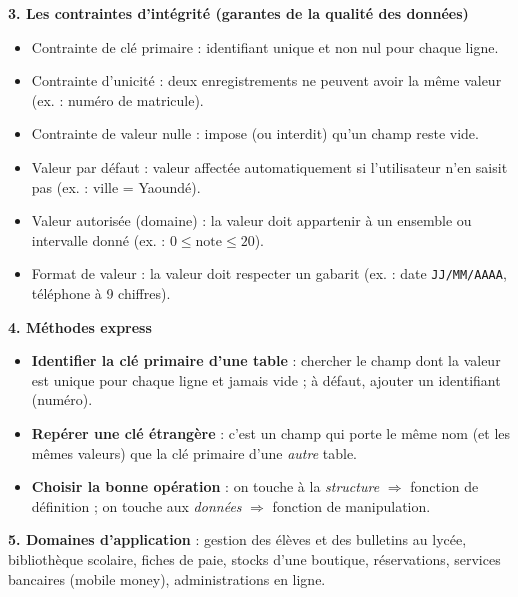 \documentclass[11pt]{article}
\newcommand{\cle}[1]{{\popxbold\color{popdark}#1}}
\begin{document}
\begin{bilan}
\textbf{3. Les contraintes d'intégrité (garantes de la qualité des données)}
\begin{itemize}
  \item \cle{Contrainte de clé primaire} : identifiant unique et non nul pour chaque ligne.
  \item \cle{Contrainte d'unicité} : deux enregistrements ne peuvent avoir la même valeur (ex. : numéro de matricule).
  \item \cle{Contrainte de valeur nulle} : impose (ou interdit) qu'un champ reste vide.
  \item \cle{Valeur par défaut} : valeur affectée automatiquement si l'utilisateur n'en saisit pas (ex. : ville = \og{}Yaoundé\fg{}).
  \item \cle{Valeur autorisée} (domaine) : la valeur doit appartenir à un ensemble ou intervalle donné (ex. : $0 \leq \text{note} \leq 20$).
  \item \cle{Format de valeur} : la valeur doit respecter un gabarit (ex. : date \texttt{JJ/MM/AAAA}, téléphone à 9 chiffres).
\end{itemize}

\textbf{4. Méthodes express}
\begin{itemize}
  \item \textbf{Identifier la clé primaire d'une table} : chercher le champ dont la valeur est unique pour chaque ligne et jamais vide ; à défaut, ajouter un identifiant (numéro).
  \item \textbf{Repérer une clé étrangère} : c'est un champ qui porte le même nom (et les mêmes valeurs) que la clé primaire d'une \emph{autre} table.
  \item \textbf{Choisir la bonne opération} : on touche à la \emph{structure} $\Rightarrow$ fonction de définition ; on touche aux \emph{données} $\Rightarrow$ fonction de manipulation.
\end{itemize}

\textbf{5. Domaines d'application} : gestion des élèves et des bulletins au lycée, bibliothèque scolaire, fiches de paie, stocks d'une boutique, réservations, services bancaires (mobile money), administrations en ligne.
\end{bilan}
\end{document}
